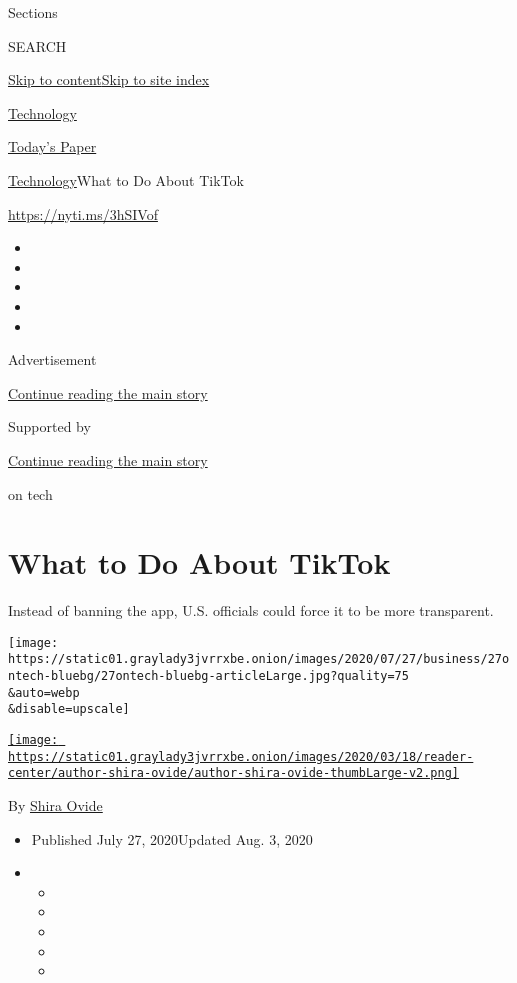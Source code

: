 Sections

SEARCH

\protect\hyperlink{site-content}{Skip to
content}\protect\hyperlink{site-index}{Skip to site index}

\href{https://www.nytimes3xbfgragh.onion/section/technology}{Technology}

\href{https://myaccount.nytimes3xbfgragh.onion/auth/login?response_type=cookie\&client_id=vi}{}

\href{https://www.nytimes3xbfgragh.onion/section/todayspaper}{Today's
Paper}

\href{/section/technology}{Technology}\textbar{}What to Do About TikTok

\url{https://nyti.ms/3hSIVof}

\begin{itemize}
\item
\item
\item
\item
\item
\end{itemize}

Advertisement

\protect\hyperlink{after-top}{Continue reading the main story}

Supported by

\protect\hyperlink{after-sponsor}{Continue reading the main story}

on tech

\hypertarget{what-to-do-about-tiktok}{%
\section{What to Do About TikTok}\label{what-to-do-about-tiktok}}

Instead of banning the app, U.S. officials could force it to be more
transparent.

\texttt{[image: https://static01.graylady3jvrrxbe.onion/images/2020/07/27/business/27ontech-bluebg/27ontech-bluebg-articleLarge.jpg?quality=75\\\&auto=webp\\\&disable=upscale]}

\href{https://www.nytimes3xbfgragh.onion/by/shira-ovide}{\texttt{[image: https://static01.graylady3jvrrxbe.onion/images/2020/03/18/reader-center/author-shira-ovide/author-shira-ovide-thumbLarge-v2.png]}}

By \href{https://www.nytimes3xbfgragh.onion/by/shira-ovide}{Shira Ovide}

\begin{itemize}
\item
  Published July 27, 2020Updated Aug. 3, 2020
\item
  \begin{itemize}
  \item
  \item
  \item
  \item
  \item
  \end{itemize}
\end{itemize}

